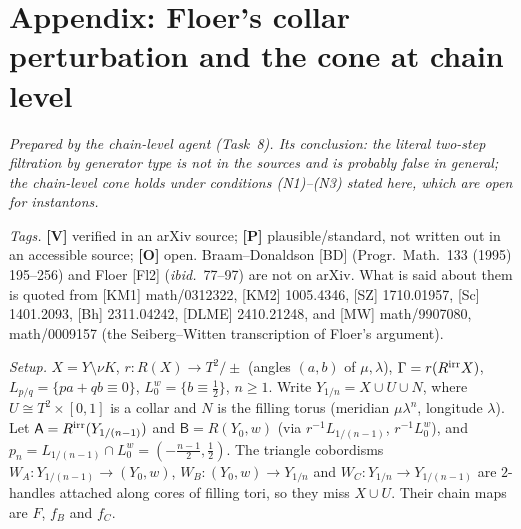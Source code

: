 \section{Appendix: Floer's collar perturbation and the cone at chain level}\label{fp:sec}
\emph{Prepared by the chain-level agent (Task~8).  Its conclusion: the literal two-step filtration by generator type is not in the sources and is probably false in general; the chain-level cone holds under conditions (N1)--(N3) stated here, which are open for instantons.}


\noindent\emph{Tags.} \textbf{[V]} verified in an arXiv source; \textbf{[P]} plausible/standard, not written out in an
accessible source; \textbf{[O]} open.  Braam--Donaldson [BD] (Progr.\ Math.\ 133 (1995) 195--256) and Floer [Fl2]
(\emph{ibid.}\ 77--97) are not on arXiv.  What is said about them is quoted from [KM1] math/0312322, [KM2] 1005.4346,
[SZ] 1710.01957, [Sc] 1401.2093, [Bh] 2311.04242, [DLME] 2410.21248, and [MW] math/9907080, math/0009157 (the
Seiberg--Witten transcription of Floer's argument).

\smallskip\noindent\emph{Setup.} $X=Y\setminus\nu K$, $r\colon R(X)\to T^2/\pm$ (angles $(a,b)$ of $\mu,\lambda$),
$\Gamma=r(R^{\rm irr}X)$, $L_{p/q}=\{pa+qb\equiv0\}$, $L^w_0=\{b\equiv\frac12\}$, $n\ge1$.  Write $Y_{1/n}=X\cup U\cup N$, where
$U\cong T^2\times[0,1]$ is a collar and $N$ is the filling torus (meridian $\mu\lambda^n$, longitude $\lambda$).  Let
$\mathsf A=R^{\rm irr}(Y_{1/(n-1)})$ and $\mathsf B=R(Y_0,w)$ (via $r^{-1}L_{1/(n-1)}$, $r^{-1}L^w_0$), and
$p_n=L_{1/(n-1)}\cap L^w_0=(-\frac{n-1}2,\frac12)$.  The triangle cobordisms $W_A\colon Y_{1/(n-1)}\to(Y_0,w)$,
$W_B\colon(Y_0,w)\to Y_{1/n}$ and $W_C\colon Y_{1/n}\to Y_{1/(n-1)}$ are $2$-handles attached along cores of filling tori, so
they miss $X\cup U$.  Their chain maps are $F$, $f_B$ and $f_C$.


